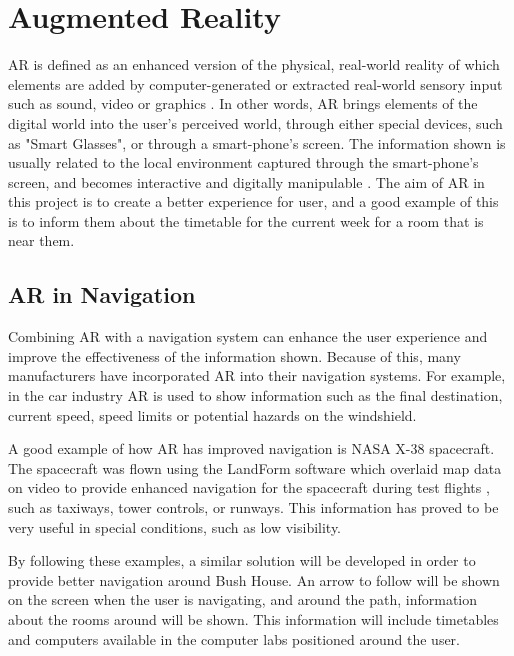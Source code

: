 \section{Augmented Reality}
AR is defined as an enhanced version of the physical, real-world reality of which elements are added by computer-generated or extracted real-world sensory input such as sound, video or graphics \cite{ar-definition}. In other words, AR brings elements of the digital world into the user's perceived world, through either special devices, such as "Smart Glasses", or through a smart-phone's screen. The information shown is usually related to the local environment captured through the smart-phone's screen, and becomes interactive and digitally manipulable \cite{ar-definition-2}. The aim of AR in this project is to create a better experience for user, and a good example of this is to inform them about the timetable for the current week for a room that is near them.

\subsection{AR in Navigation}

Combining AR with a navigation system can enhance the user experience and improve the effectiveness of the information shown. Because of this, many manufacturers have incorporated AR into their navigation systems. For example, in the car industry AR is used to show information such as the final destination, current speed, speed limits or potential hazards on the windshield.

A good example of how AR has improved navigation is NASA X-38 spacecraft. The spacecraft was flown using the LandForm software which overlaid map data on video to provide enhanced navigation for the spacecraft during test flights \cite{nasa-ar-nav}, such as taxiways, tower controls, or runways. This information has proved to be very useful in special conditions, such as low visibility. 

By following these examples, a similar solution will be developed in order to provide better navigation around Bush House. An arrow to follow will be shown on the screen when the user is navigating, and around the path, information about the rooms around will be shown. This information will include timetables and computers available in the computer labs positioned around the user.


